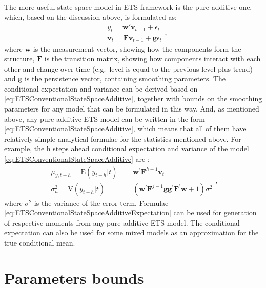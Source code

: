 \documentclass[]{book}
\theoremstyle{definition}
\theoremstyle{definition}
\theoremstyle{definition}
\theoremstyle{definition}
\theoremstyle{remark}
\begin{document}
The more useful state space model in ETS framework is the pure additive one, which, based on the discussion above, is formulated as:
\begin{equation}
  \begin{aligned}
  & {y}_{t} = \mathbf{w}' \mathbf{v}_{t-1} + \epsilon_t \\
  & \mathbf{v}_{t} = \mathbf{F} \mathbf{v}_{t-1} + \mathbf{g} \epsilon_t
  \end{aligned},
  \label{eq:ETSConventionalStateSpaceAdditive}
\end{equation}
where \(\mathbf{w}\) is the measurement vector, showing how the components form the structure, \(\mathbf{F}\) is the transition matrix, showing how components interact with each other and change over time (e.g.~level is equal to the previous level plus trend) and \(\mathbf{g}\) is the persistence vector, containing smoothing parameters. The conditional expectation and variance can be derived based on \eqref{eq:ETSConventionalStateSpaceAdditive}, together with bounds on the smoothing parameters for any model that can be formulated in this way. And, as mentioned above, any pure additive ETS model can be written in the form \eqref{eq:ETSConventionalStateSpaceAdditive}, which means that all of them have relatively simple analytical formulae for the statistics mentioned above. For example, the h steps ahead conditional expectation and variance of the model \eqref{eq:ETSConventionalStateSpaceAdditive} are \citep[Chapter 6]{Hyndman2008b}:
\begin{equation}
  \begin{aligned}
    \mu_{y,t+h} = \mathrm{E}(y_{t+h}|t) = & \mathbf{w}^\prime \mathbf{F}^{h-1} \mathbf{v}_{t} \\
    \sigma^2_{h} = \mathrm{V}(y_{t+h}|t) = & \left(\mathbf{w}^\prime \mathbf{F}^{j-1} \mathbf{g} \mathbf{g}^\prime \mathbf{F}^\prime \mathbf{w} + 1 \right) \sigma^2
  \end{aligned},
  \label{eq:ETSConventionalStateSpaceAdditiveExpectation}
\end{equation}
where \(\sigma^2\) is the variance of the error term. Formulae \eqref{eq:ETSConventionalStateSpaceAdditiveExpectation} can be used for generation of respective moments from any pure additive ETS model. The conditional expectation can also be used for some mixed models as an approximation for the true conditional mean.

\hypertarget{ETSParametersBounds}{%
\section{Parameters bounds}\label{ETSParametersBounds}}
\end{document}
